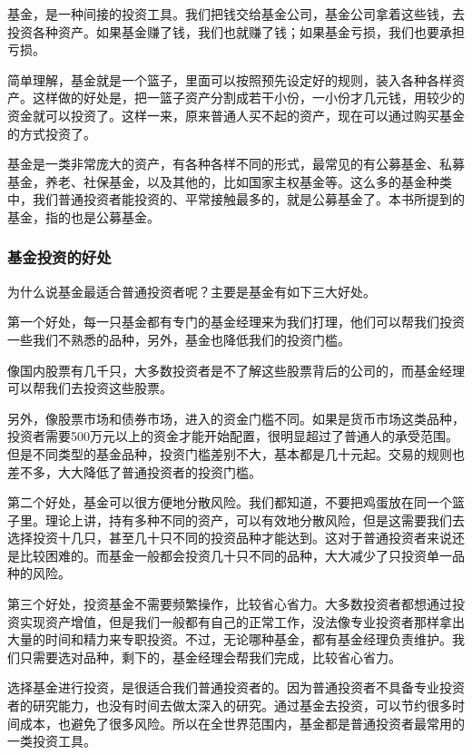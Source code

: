 基金，是一种间接的投资工具。我们把钱交给基金公司，基金公司拿着这些钱，去投资各种资产。如果基金赚了钱，我们也就赚了钱；如果基金亏损，我们也要承担亏损。

简单理解，基金就是一个篮子，里面可以按照预先设定好的规则，装入各种各样资产。这样做的好处是，把一篮子资产分割成若干小份，一小份才几元钱，用较少的资金就可以投资了。这样一来，原来普通人买不起的资产，现在可以通过购买基金的方式投资了。

基金是一类非常庞大的资产，有各种各样不同的形式，最常见的有公募基金、私募基金，养老、社保基金，以及其他的，比如国家主权基金等。这么多的基金种类中，我们普通投资者能投资的、平常接触最多的，就是公募基金了。本书所提到的基金，指的也是公募基金。

\subsubsection{基金投资的好处}

为什么说基金最适合普通投资者呢？主要是基金有如下三大好处。

第一个好处，每一只基金都有专门的基金经理来为我们打理，他们可以帮我们投资一些我们不熟悉的品种，另外，基金也降低我们的投资门槛。

像国内股票有几千只，大多数投资者是不了解这些股票背后的公司的，而基金经理可以帮我们去投资这些股票。

另外，像股票市场和债券市场，进入的资金门槛不同。如果是货币市场这类品种，投资者需要500万元以上的资金才能开始配置，很明显超过了普通人的承受范围。但是不同类型的基金品种，投资门槛差别不大，基本都是几十元起。交易的规则也差不多，大大降低了普通投资者的投资门槛。

第二个好处，基金可以很方便地分散风险。我们都知道，不要把鸡蛋放在同一个篮子里。理论上讲，持有多种不同的资产，可以有效地分散风险，但是这需要我们去选择投资十几只，甚至几十只不同的投资品种才能达到。这对于普通投资者来说还是比较困难的。而基金一般都会投资几十只不同的品种，大大减少了只投资单一品种的风险。

第三个好处，投资基金不需要频繁操作，比较省心省力。大多数投资者都想通过投资实现资产增值，但是我们一般都有自己的正常工作，没法像专业投资者那样拿出大量的时间和精力来专职投资。不过，无论哪种基金，都有基金经理负责维护。我们只需要选对品种，剩下的，基金经理会帮我们完成，比较省心省力。

选择基金进行投资，是很适合我们普通投资者的。因为普通投资者不具备专业投资者的研究能力，也没有时间去做太深入的研究。通过基金去投资，可以节约很多时间成本，也避免了很多风险。所以在全世界范围内，基金都是普通投资者最常用的一类投资工具。


